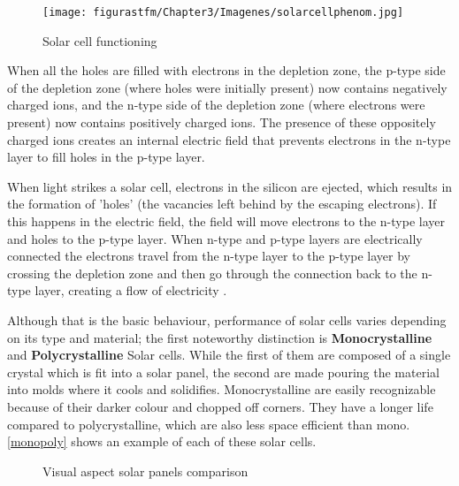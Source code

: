 	\begin{figure}[h] 
				\centering
				\texttt{[image: figurastfm/Chapter3/Imagenes/solarcellphenom.jpg]}
				\caption{Solar cell functioning \cite{solarcell}}      		
				\label{solarcells}
  		\end{figure}

When all the holes are filled with electrons in the depletion zone, the p-type side of the depletion zone (where holes were initially present) now contains negatively charged ions, and the n-type side of the depletion zone (where electrons were present) now contains positively charged ions. The presence of these oppositely charged ions creates an internal electric field that prevents electrons in the n-type layer to fill holes in the p-type layer.

When light strikes a solar cell, electrons in the silicon are ejected, which results in the formation of 'holes' (the vacancies left behind by the escaping electrons). If this happens in the electric field, the field will move electrons to the n-type layer and holes to the p-type layer. When n-type and p-type layers are electrically connected the electrons travel from the n-type layer to the p-type layer by crossing the depletion zone and then go through the connection back to the n-type layer, creating a flow of electricity \cite{solarcell}.

			Although that is the basic behaviour, performance of solar cells varies depending on its type and material; the first noteworthy distinction is \textbf{Monocrystalline} and \textbf{Polycrystalline} Solar cells. While the first of them are composed of a single crystal which is fit into a solar panel, the second are made pouring the material into molds where it cools and solidifies. Monocrystalline are easily recognizable because of their darker colour and chopped off corners. They have a longer life compared to polycrystalline, which are also less space efficient than mono. \autoref{monopoly} shows an example of each of these solar cells.
			
			\begin{figure}[H]
			\centering
			 \quad
			\caption{Visual aspect solar panels comparison \cite{monopolyimg}} \label{monopoly}
			\vspace{-2cm}
\end{figure}
			
